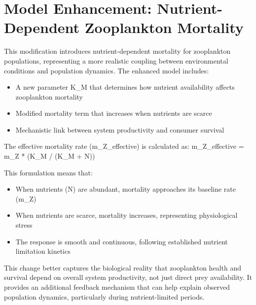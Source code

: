 \section{Model Enhancement: Nutrient-Dependent Zooplankton Mortality}

This modification introduces nutrient-dependent mortality for zooplankton populations, representing a more realistic coupling between environmental conditions and population dynamics. The enhanced model includes:

\begin{itemize}
    \item A new parameter K_M that determines how nutrient availability affects zooplankton mortality
    \item Modified mortality term that increases when nutrients are scarce
    \item Mechanistic link between system productivity and consumer survival
\end{itemize}

The effective mortality rate (m_Z_effective) is calculated as:
m_Z_effective = m_Z * (K_M / (K_M + N))

This formulation means that:
\begin{itemize}
    \item When nutrients (N) are abundant, mortality approaches its baseline rate (m_Z)
    \item When nutrients are scarce, mortality increases, representing physiological stress
    \item The response is smooth and continuous, following established nutrient limitation kinetics
\end{itemize}

This change better captures the biological reality that zooplankton health and survival depend on overall system productivity, not just direct prey availability. It provides an additional feedback mechanism that can help explain observed population dynamics, particularly during nutrient-limited periods.
